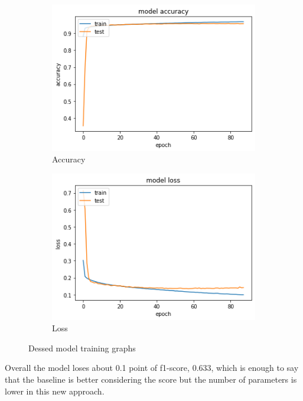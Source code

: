 \documentclass{article}
\begin{document}
\begin{figure}[H]
	\centering
	\begin{subfigure}{.5\textwidth}
		\centering
		\includegraphics[width=.9\linewidth]{./images/poly/dessed_acc.png}
		\caption{Accuracy}
	\end{subfigure}%
	\begin{subfigure}{.5\textwidth}
		\centering
		\includegraphics[width=.9\linewidth]{./images/poly/dessed_loss.png}
		\caption{Loss}
	\end{subfigure}
	\caption{Dessed model training graphs}
	\label{fig:poly_des_result}
\end{figure}

Overall the model loses about 0.1 point of f1-score, 0.633, which is enough to say that the baseline is better considering the score but the number of parameters is lower in this new approach. 
\end{document}
